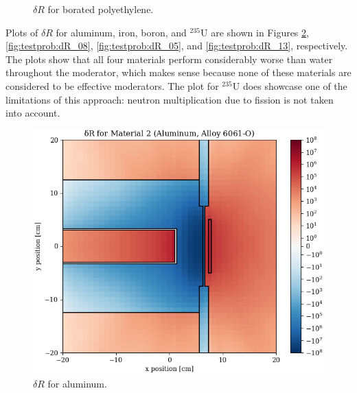 \begin{figure}
\begin{minipage}{0.49\linewidth}
    \caption{$\delta R$ for borated polyethylene.}
    \label{fig:testprob:dR_09}
  \end{minipage}
\end{figure}

Plots of $\delta R$ for aluminum, iron, boron, and ${}^{235}\text{U}$ are shown in Figures \ref{fig:testprob:dR_02}, \ref{fig:testprob:dR_08}, \ref{fig:testprob:dR_05}, and \ref{fig:testprob:dR_13}, respectively.
The plots show that all four materials perform considerably worse than water throughout the moderator, which makes sense because none of these materials are considered to be effective moderators.
The plot for ${}^{235}\text{U}$ does showcase one of the limitations of this approach: neutron multiplication due to fission is not taken into account.

\begin{figure}
  \begin{minipage}{0.49\linewidth}
    \centering
    \includegraphics[width=\linewidth]{content/testprob/dR_02.png}
    \caption{$\delta R$ for aluminum.}
    \label{fig:testprob:dR_02}
  \end{minipage}
  \hfill
  \begin{minipage}{0.49\linewidth}
    \centering

\end{minipage}
\end{figure}
